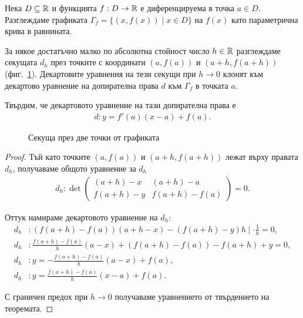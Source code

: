 \documentclass[numbers=endperiod, bibliography=totocnumbered]{scrartcl}
\begin{document}
\bigskip
\begin{minipage}{0.45\textwidth}
  \begin{theorem}
    Нека \( D \subseteq \mathbb{R} \) и функцията \( f: D \to \mathbb{R} \) е диференцируема в точка \( a \in D \). Разглеждаме графиката \( \Gamma_f = \{ (x, f(x)) \mid x \in D \} \) на \( f(x) \) като параметрична крива в равнината.

    За някое достатъчно малко по абсолютна стойност число \( h \in \mathbb{R} \) разглеждаме секущата \( d_h \) през точките с координати \( (a, f(a)) \) и \( (a+h, f(a+h)) \) (фиг.~\ref{fig:secant}). Декартовите уравнения на тези секущи при \( h \to 0 \) клонят към декартово уравнение на допирателна права \( d \) към \( \Gamma_f \) в точката \( a \).

    Твърдим, че декартовото уравнение на тази допирателна права е
    \begin{align*}
      d: y = f'(a) (x-a) + f(a).
    \end{align*}
  \end{theorem}
\end{minipage}
\begin{minipage}{0.45\textwidth}
  \begin{figure}[H]
    \begin{center}
    \end{center}
    \caption{Секуща през две точки от графиката}\label{fig:secant}
  \end{figure}
\end{minipage}
\begin{proof}
  Тъй като точките \( (a, f(a)) \) и \( (a+h, f(a+h)) \) лежат върху правата \( d_h \), получаваме общото уравнение за \( d_h \)
    \begin{align*}
      d_h: \det \begin{pmatrix}
      (a+h)-x & (a+h)-a \\
      f(a+h)-y & f(a+h)-f(a)
    \end{pmatrix}
    = 0.
  \end{align*}

  Оттук намираме декартовото уравнение на \( d_h \):
  \begin{align*}
    d_h&: (f(a+h) - f(a)) (a+h-x) - (f(a+h)-y)h \mid \cdot \frac 1 h = 0,
    \\
    d_h&: \frac {f(a+h) - f(a)} h (a-x) + (f(a+h) - f(a)) - f(a+h) + y = 0,
    \\
    d_h&: y = -\frac {f(a+h) - f(a)} h (a-x) + f(a),
    \\
    d_h&: y = \frac {f(a+h) - f(a)} h (x-a) + f(a).
  \end{align*}

  С граничен предох при \( h \to 0 \) получаваме уравнението от твърдението на теоремата.
\end{proof}
\end{document}
